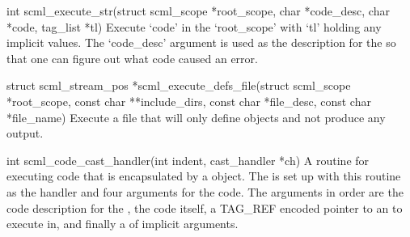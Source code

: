 \begin{cprototypelist}
  \item[int scml_execute_str(struct scml_scope *root_scope, char
					 *code_desc, char *code, tag_list
					 *tl)] Execute \SCML{} `code' in the
  `root\_scope' with `tl' holding any implicit values.  The `code\_desc' argument
  is used as the description for the  so that one can figure
  out what \SCML{} code caused an error.

  \item[struct scml_stream_pos *scml_execute_defs_file(struct
  scml_scope *root_scope, const char **include_dirs, const char *file_desc,
  const char *file_name)] Execute a file that will only define objects and not
  produce any output.

  \item[int scml_code_cast_handler(int indent, cast_handler *ch)] A routine for
  executing \SCML{} code that is encapsulated by a  object.
  The  is set up with this routine as the handler and four
  arguments for the \SCML{} code.  The arguments in order are the code
  description for the , the \SCML{} code itself, a TAG\_REF
  encoded pointer to an  to execute in, and finally a
   of implicit arguments.
\end{cprototypelist}




